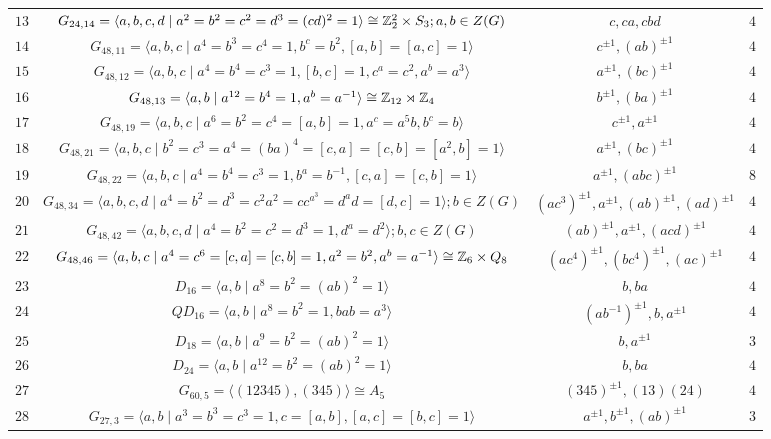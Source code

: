 \documentclass{amsart}
\begin{document}
{\begin{table}
\begin{tabular}{|c|c|c|c|}
			$13$&$G_{24,14}=\langle a,b,c,d\mid a^2=b^2=c^2=d^3=(cd)^2=1\rangle\cong \Bbb Z_2^2\times S_3; a,b\in Z(G)$&$ c, ca, cbd$&$4$\\
			$14$&$G_{48,11}=\langle a,b,c\mid a^4=b^3=c^4=1, b^c=b^2, [a,b]=[a,c]=1\rangle$&$ c^{\pm 1}, (ab)^{\pm 1}$&$4$\\ %
			$15$&$G_{48,12}=\langle a,b,c\mid a^4=b^4=c^3=1, [b,c]=1,c^a=c^2,a^b=a^3\rangle$&$a^{\pm 1}, (bc)^{\pm 1}$&$4$\\ %
			$16$&$G_{48,13}=\langle a,b\mid a^{12}=b^4=1, a^b=a^{-1}\rangle\cong\Bbb Z_{12}\rtimes\Bbb Z_4$&$  b^{\pm 1}, (ba)^{\pm 1} $&$4$\\ %
			$17$&$G_{48,19}=\langle a,b,c\mid a^6=b^2=c^4=[a,b]=1, a^c=a^5b,b^c=b\rangle$&$c^{\pm 1},  a^{\pm 1}$&$4$\\ %
			$18$&$G_{48,21}=\langle a,b,c\mid  b^2=c^3=a^4=(ba)^4=[c,a]=[c,b]=[a^2,b]=1\rangle$&$ a^{\pm 1}, (bc)^{\pm 1}$&$4$\\ %
			$19$&$G_{48,22}=\langle a,b,c\mid a^4=b^4=c^3=1, b^a=b^{-1},[c,a]=[c,b]=1\rangle$&$ a^{\pm 1}, (abc)^{\pm 1} $&$8$\\ %
			$20$&$G_{48,34}=\langle a,b,c,d\mid a^4=b^2=d^3=c^2a^2=cc^{a^{3}}=d^ad=[d,c]=1\rangle; b\in Z(G) $&$   (ac^{3})^{\pm 1}, a^{\pm 1}, (ab)^{\pm 1}, (ad)^{\pm 1} $&$4$\\ %
			$21$&$G_{48,42}=\langle a,b,c,d\mid a^4=b^2=c^2=d^3=1, d^a=d^2\rangle; b,c\in Z(G) $&$ (ab)^{\pm 1}, a^{\pm 1}, (acd)^{\pm 1}$&$4$\\ %
			$22$&$G_{48,46}=\langle a,b,c\mid a^4=c^6=[c,a]=[c,b]=1, a^2=b^2,a^b=a^{-1}\rangle\cong\Bbb Z_6\times Q_8$&$(ac^4)^{\pm 1}, (bc^4)^{\pm 1}, (ac)^{\pm 1}$&$4$\\%
			$23$&$D_{16}=\langle a,b\mid a^8=b^2=(ab)^2=1\rangle$&$b,ba$&$4$\\
			$24$&$QD_{16}=\langle a,b\mid a^8=b^2=1, bab=a^3\rangle$&$(ab^{-1})^{\pm 1}, b, a^{\pm 1}$&$4$\\
			$25$&$D_{18}=\langle a,b\mid a^9=b^2=(ab)^2=1\rangle$&$b, a^{\pm 1}$&$3$\\
			$26$&$D_{24}=\langle a,b\mid a^{12}=b^2=(ab)^2=1\rangle$&$b, ba$&$4$\\
			$27$&$G_{60,5}=\langle (12345), (345)\rangle\cong A_5$&$(345)^{\pm 1}, (13)(24)$&$4$\\%
			$28$&$G_{27,3}=\langle a,b\mid a^3=b^3=c^3=1,c=[a,b], [a,c]=[b,c]=1\rangle$&$a^{\pm 1},b^{\pm 1},(ab)^{\pm 1}$&$3$\\%

\end{tabular}
\end{table}}
\end{document}
